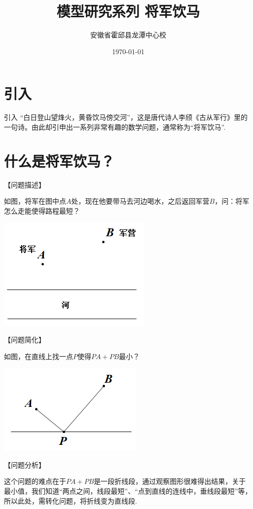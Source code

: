 \documentclass[10pt]{ctexart}
\title{模型研究系列 \quad 将军饮马}
\author{安徽省霍邱县龙潭中心校}
\date{\today}
\begin{document}
\maketitle
\tableofcontents


\section{引入}

{引入}
“白日登山望烽火，黄昏饮马傍交河”，这是唐代诗人李颀《古从军行》里的一句诗。由此却引申出一系列非常有趣的数学问题，通常称为“将军饮马”.

\section{什么是将军饮马？}
【问题描述】

如图，将军在图中点$A$处，现在他要带马去河边喝水，之后返回军营$B$，问：将军怎么走能使得路程最短？
\begin{center}
\includegraphics[scale=0.6]{figure/1-1.PNG} 
\end{center}

【问题简化】

如图，在直线上找一点$P$使得$PA+PB$最小？

\includegraphics[scale=0.6]{figure/1-2.PNG} 

【问题分析】

这个问题的难点在于$PA+PB$是一段折线段，通过观察图形很难得出结果，关于最小值，我们知道“两点之间，线段最短”、“点到直线的连线中，垂线段最短”等，所以此处，需转化问题，将折线变为直线段.
\end{document}
